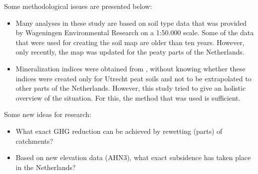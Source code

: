 \documentclass[a4paper,12pt]{scrbook}
\begin{document}
Some methodological issues are presented below:
\begin{itemize}
\item Many analyses in these study are based on soil type data that was provided by Wageningen Environmental Research on a 1:50.000 scale. Some of the data that were used for creating the soil map are older than ten years. However, only recently, the map was updated for the peaty parts of the Netherlands. 
\item Mineralization indices were obtained from \citep{stouthamer2008toelichting}, without knowing whether these indices were created only for Utrecht peat soils and not to be extrapolated to other parts of the Netherlands. However, this study tried to give an holistic overview of the situation. For this, the method that was used is sufficient.
\end{itemize} 

Some new ideas for research:
\begin{itemize}
\item What exact GHG reduction can be achieved by rewetting (parts) of catchments?
\item Based on new elevation data (AHN3), what exact subsidence has taken place in the Netherlands?
\end{itemize}




\end{document}
